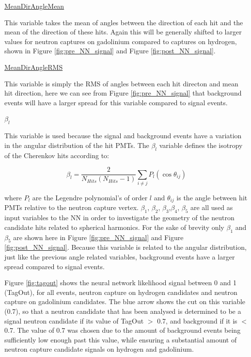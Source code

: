 \underline{MeanDirAngleMean}

This variable takes the mean of angles between the direction of each hit and the mean of the direction of these hits. Again this will be generally shifted to larger values for neutron captures on gadolinium compared to captures on hydrogen, shown in Figure \ref{fig:pre_NN_signal} and Figure \ref{fig:post_NN_signal}. 

\underline{MeanDirAngleRMS}

This variable is simply the RMS of angles between each hit directon and mean hit direction, here we can see from Figure \ref{fig:pre_NN_signal} that background events will have a larger spread for this variable compared to signal events. 



\underline{$\beta_{l}$}

This variable is used because the signal and background events have a variation in the angular distribution of the hit PMTs. 
The $\beta_{l}$ variable defines the isotropy of the Cherenkov hits according to:

\begin{equation}
    \beta_{l}=\frac{2}{N_{H i t s}\left(N_{H i t s}-1\right)} \sum_{i \neq j} P_l\left(\cos \theta_{i j}\right)
\end{equation}

where $P_{l}$ are the Legendre polynomial's of order $l$ and $\theta_{ij}$ is the angle between hit PMTs relative to the neutron capture vertex. $\beta_{1}$, $\beta_{2}$, $\beta_{3}$,$\beta_{4}$, $\beta_{5}$ are all used as input variables to the NN in order to investigate the geometry of the neutron candidate hits related to spherical harmonics. For the sake of brevity only $\beta_{1}$ and $\beta_{5}$ are shown here in Figure \ref{fig:pre_NN_signal} and Figure \ref{fig:post_NN_signal}. Because this variable is related to the angular distribution, just like the previous angle related variables, background events have a larger spread compared to signal events.




Figure \ref{fig:tagout} shows the neural network likelihood signal between 0 and 1 (TagOut), for all events, neutron capture on hydrogen candidates and neutron capture on gadolinium candidates. The blue arrow shows the cut on this variable (0.7), so that a neutron candidate that has been analysed is determined to be a signal neutron candidate if its value of TagOut $>$ 0.7, and background if it is $<$ 0.7. The value of 0.7 was chosen due to the amount of background events being sufficiently low enough past this value, while ensuring a substantial amount of neutron capture candidate signals on hydrogen and gadolinium.

